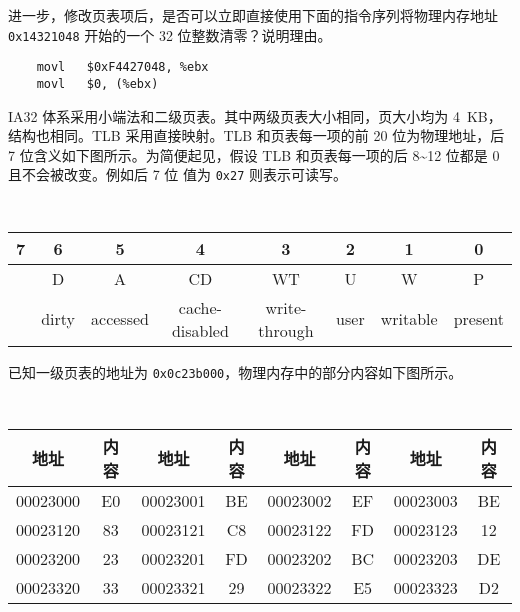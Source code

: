 \begin{problems}
        进一步，修改页表项后，是否可以立即直接使用下面的指令序列将物理内存地址 \verb|0x14321048| 开始的一个 32 位整数清零？说明理由。
        \begin{verbatim}
    movl   $0xF4427048, %ebx
    movl   $0, (%ebx)
        \end{verbatim}
         IA32 体系采用小端法和二级页表。其中两级页表大小相同，页大小均为 \SI{4}{KB}，结构也相同。TLB 采用直接映射。TLB 和页表每一项的前 20 位为物理地址，后 7 位含义如下图所示。为简便起见，假设 TLB 和页表每一项的后 8\textasciitilde 12 位都是 0 且不会被改变。例如后 7 位 值为 \verb|0x27| 则表示可读写。
        \begin{table}[H]
            \tt
            \centering
            \begin{tabular}{cccccccc}
                {\footnotesize 7} & {\footnotesize 6} & {\footnotesize 5} & {\footnotesize 4} & {\footnotesize 3} & {\footnotesize 2} & {\footnotesize 1} & {\footnotesize 0} \\ \hline
                \multicolumn{1}{|c|}{\cellcolor{gray!50}} & \multicolumn{1}{c|}{D} & \multicolumn{1}{c|}{A} & \multicolumn{1}{c|}{CD} & \multicolumn{1}{c|}{WT} & \multicolumn{1}{c|}{U} & \multicolumn{1}{c|}{W} & \multicolumn{1}{c|}{P} \\ \hline
                & {\footnotesize dirty} & {\footnotesize accessed} & {\footnotesize cache-disabled} & {\footnotesize write-through} & {\footnotesize user} & {\footnotesize writable} & {\footnotesize present}
            \end{tabular}
        \end{table}
        已知一级页表的地址为 \verb|0x0c23b000|，物理内存中的部分内容如下图所示。
        \begin{table}[H]
            \tt
            \centering
            \begin{tabular}{|c|c|c|c|c|c|c|c|}
                \hline
                地址 & 内容 & 地址 & 内容 & 地址 & 内容 & 地址 & 内容 \\ \hline
                00023000 & E0 & 00023001 & BE & 00023002 & EF & 00023003 & BE \\ \hline
                00023120 & 83 & 00023121 & C8 & 00023122 & FD & 00023123 & 12 \\ \hline
                00023200 & 23 & 00023201 & FD & 00023202 & BC & 00023203 & DE \\ \hline
                00023320 & 33 & 00023321 & 29 & 00023322 & E5 & 00023323 & D2 \\ \hline

\end{tabular}
\end{table}
\end{problems}
